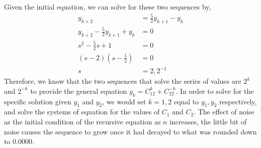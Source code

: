 \documentclass{article}
\begin{document}
\begin{enumerate}
    Given the initial equation, we can solve for these two sequences by,
    \begin{align*}
        y_{k+2}&=\frac{5}{2}y_{k+1}-y_k\\
        y_{k+2}-\frac{5}{2}y_{k+1}+y_k&=0\\
        s^2-\frac{5}{2}s+1&=0\\
        (s-2)(s-\frac{1}{2})&=0\\
        s&= 2, 2^{-1}
    \end{align*}
    Therefore, we know that the two sequences that solve the series of values are $2^k$ and $2^{-k}$ to provide the general equation $y_k=C_12^k+C_22^{-k}$. In order to solve for the specific solution given $y_1$ and $y_2$, we would set $k=1, 2$ equal to $y_1, y_2$ respectively, and solve the systems of equation for the values of $C_1 \text{ and } C_2$. The effect of noise as the initial condition of the recursive equation as $n$ increases, the little bit of noise causes the sequence to grow once it had decayed to what was rounded down to $0.0000$.
    
\end{enumerate}
\end{document}
